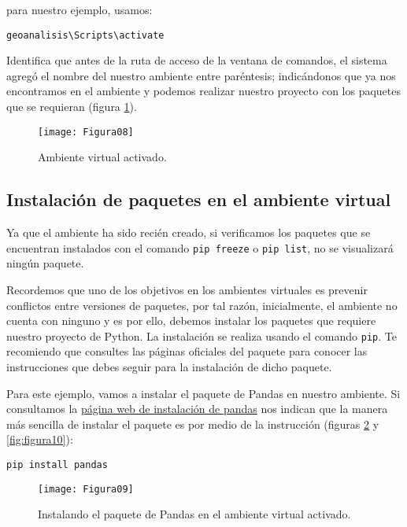 para nuestro ejemplo, usamos:
\begin{verbatim}
geoanalisis\Scripts\activate
\end{verbatim}
	
Identifica que antes de la ruta de acceso de la ventana de comandos, el sistema agregó el nombre del nuestro ambiente entre paréntesis; indicándonos que ya nos encontramos en el ambiente y podemos realizar nuestro proyecto con los paquetes que se requieran (figura \ref{fig:figura08}).
	
\begin{figure}[H]
\centering
\texttt{[image: Figura08]}
\caption{Ambiente virtual activado.}
\label{fig:figura08}
\end{figure}
	
\subsection{Instalación de paquetes en el ambiente virtual}
Ya que el ambiente ha sido recién creado, si verificamos los paquetes que se encuentran instalados con el comando \texttt{pip freeze} o \texttt{pip list}, no se visualizará ningún paquete.\bigskip
	
Recordemos que uno de los objetivos en los ambientes virtuales es prevenir conflictos entre versiones de paquetes, por tal razón, inicialmente, el ambiente no cuenta con ninguno y es por ello, debemos instalar los paquetes que requiere nuestro proyecto de Python. La instalación se realiza usando el comando \texttt{pip}. Te recomiendo que consultes las páginas oficiales del paquete para conocer las instrucciones que debes seguir para la instalación de dicho paquete.\bigskip
	
Para este ejemplo, vamos a instalar el paquete de Pandas en nuestro ambiente. Si consultamos la \href{https://pandas.pydata.org/pandas-docs/stable/getting_started/install.html}{página web de instalación de pandas} nos indican que la manera más sencilla de instalar el paquete es por medio de la instrucción (figuras \ref{fig:figura09} y \ref{fig:figura10}):
\begin{verbatim}
pip install pandas
\end{verbatim} 
	
\begin{figure}[H]
\centering
\texttt{[image: Figura09]}
\caption{Instalando el paquete de Pandas en el ambiente virtual activado.}
\label{fig:figura09}
\end{figure}
	
